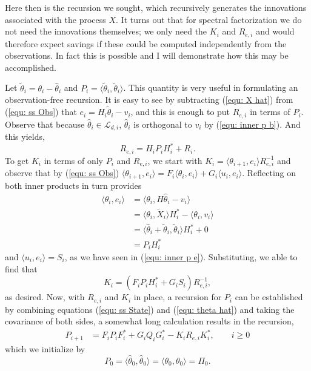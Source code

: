 \documentclass[12pt]{amsart}
\begin{document}
Here then is the recursion we sought, which recursively generates the innovations associated with the process $X$. 
It turns out that for spectral factorization we do not need the innovations themselves; we only need the $K_i$ and $R_{e,i}$ and would therefore expect savings if these could be computed independently from the observations. In fact this is possible and I will demonstrate how this may be accomplished.

Let $\tilde{\theta}_i = \theta_i - \hat{\theta}_{i}$ and $P_{i} = \langle \tilde{\theta}_{i},\tilde{\theta}_{i} \rangle$. This quantity is very useful in formulating an observation-free recursion. It is easy to see by subtracting (\ref{equ: X hat}) from (\ref{equ: ss Obs}) that $e_i = H_i\tilde{\theta}_{i} - v_i$, and this is enough to put $R_{e,i}$ in terms of $P_i$.
Observe that because $\hat{\theta}_{i}\in \mathcal{L}_{d,i}$,  $\hat{\theta}_{i}$ is orthogonal to $v_i$ by (\ref{equ: inner p b}). And this yields,
$$R_{e,i} = H_iP_iH^*_i + R_i.$$
To get $K_i$ in terms of only $P_i$ and $R_{e,i}$, we start with $K_i = \langle \theta_{i+1}, e_i \rangle R_{e,i}^{-1}$ and observe that by (\ref{equ: ss Obs}) $\langle \theta_{i+1}, e_i \rangle = F_i\langle \theta_{i}, e_i \rangle  + G_i\langle u_i, e_i \rangle$. Reflecting on both inner products in turn provides
\begin{align*}
\langle \theta_{i}, e_i \rangle &= \langle \theta_{i}, H\hat\theta_i - v_i \rangle\\
&= \langle \theta_{i}, \tilde{X}_i \rangle H^*_i - \langle \theta_{i}, v_i \rangle \\
&= \langle \hat\theta_{i} + \tilde\theta_i, \tilde\theta_i \rangle H^*_i + 0 \\
&= P_i H^*_i
\end{align*}
and $\langle u_{i}, e_i \rangle = S_i$, as we have seen in (\ref{equ: inner p e}). Substituting, we able to find that
$$K_i = (F_iP_iH_i^* + G_iS_i) R_{e,i}^{-1},$$
as desired.
Now, with $R_{e,i}$ and $K_i$ in place, a recursion for $P_i$ can be established by
combining equations (\ref{equ: ss State}) and (\ref{equ: theta hat}) and taking the covariance of both sides, a somewhat long calculation results in the recursion,
\begin{align}
\label{equ: DL} P_{i+1} &= F_iP_{i}F_i^* + G_iQ_iG_i^* - K_iR_{e,i}K^*_i,\qquad i\ge 0
\end{align}
which we initialize by $$P_{0} = \langle \hat{\theta}_{0}, \hat{\theta}_{0} \rangle = \langle \theta_0, \theta_0 \rangle = \Pi_0.$$ 
\end{document}
